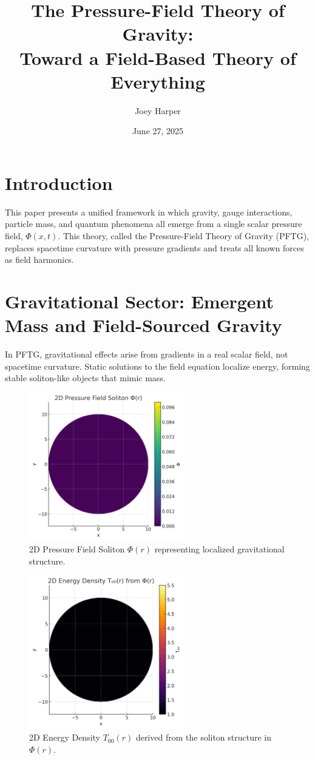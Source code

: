 \documentclass[12pt]{article}
\title{The Pressure-Field Theory of Gravity:\\Toward a Field-Based Theory of Everything}
\author{Joey Harper}
\date{June 27, 2025}
\begin{document}
\maketitle

\section{Introduction}
This paper presents a unified framework in which gravity, gauge interactions, particle mass, and quantum phenomena all emerge from a single scalar pressure field, $\Phi(x, t)$. This theory, called the Pressure-Field Theory of Gravity (PFTG), replaces spacetime curvature with pressure gradients and treats all known forces as field harmonics.

\section{Gravitational Sector: Emergent Mass and Field-Sourced Gravity}
In PFTG, gravitational effects arise from gradients in a real scalar field, not spacetime curvature. Static solutions to the field equation localize energy, forming stable soliton-like objects that mimic mass.

\begin{figure}[h]
\centering
\includegraphics[width=0.6\textwidth]{2D_Pressure_Soliton.png}
\caption{2D Pressure Field Soliton $\Phi(r)$ representing localized gravitational structure.}
\end{figure}

\begin{figure}[h]
\centering
\includegraphics[width=0.6\textwidth]{2D_Energy_Density.png}
\caption{2D Energy Density $T_{00}(r)$ derived from the soliton structure in $\Phi(r)$.}
\end{figure}
\end{document}
